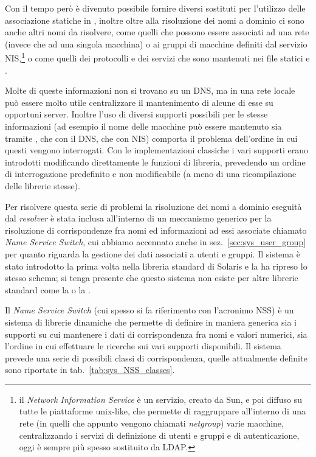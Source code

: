 Con il tempo però è divenuto possibile fornire diversi sostituti per
l'utilizzo delle associazione statiche in , inoltre oltre
alla risoluzione dei nomi a dominio ci sono anche altri nomi da risolvere,
come quelli che possono essere associati ad una rete (invece che ad una
singola macchina) o ai gruppi di macchine definiti dal servizio
NIS,\footnote{il \textit{Network Information Service} è un servizio, creato da
  Sun, e poi diffuso su tutte le piattaforme unix-like, che permette di
  raggruppare all'interno di una rete (in quelli che appunto vengono chiamati
  \textit{netgroup}) varie macchine, centralizzando i servizi di definizione
  di utenti e gruppi e di autenticazione, oggi è sempre più spesso sostituito
  da LDAP.} o come quelli dei protocolli e dei servizi che sono mantenuti nei
file statici  e .  

Molte di queste informazioni non si trovano su un DNS, ma in una rete locale
può essere molto utile centralizzare il mantenimento di alcune di esse su
opportuni server.  Inoltre l'uso di diversi supporti possibili per le stesse
informazioni (ad esempio il nome delle macchine può essere mantenuto sia
tramite , che con il DNS, che con NIS) comporta il
problema dell'ordine in cui questi vengono interrogati. Con le implementazioni
classiche i vari supporti erano introdotti modificando direttamente le
funzioni di libreria, prevedendo un ordine di interrogazione predefinito e non
modificabile (a meno di una ricompilazione delle librerie stesse).


Per risolvere questa serie di problemi la risoluzione dei nomi a dominio
eseguità dal \textit{resolver} è stata inclusa all'interno di un meccanismo
generico per la risoluzione di corrispondenze fra nomi ed informazioni ad essi
associate chiamato \textit{Name Service Switch}, cui abbiamo accennato anche in
sez.~\ref{sec:sys_user_group} per quanto riguarda la gestione dei dati
associati a utenti e gruppi. Il sistema è stato introdotto la prima volta
nella libreria standard di Solaris e la  ha ripreso lo stesso
schema; si tenga presente che questo sistema non esiste per altre librerie
standard come la  o la .

Il \textit{Name Service Switch} (cui spesso si fa riferimento con l'acronimo
NSS) è un sistema di librerie dinamiche che permette di definire in maniera
generica sia i supporti su cui mantenere i dati di corrispondenza fra nomi e
valori numerici, sia l'ordine in cui effettuare le ricerche sui vari supporti
disponibili. Il sistema prevede una serie di possibili classi di
corrispondenza, quelle attualmente definite sono riportate in
tab.~\ref{tab:sys_NSS_classes}.

